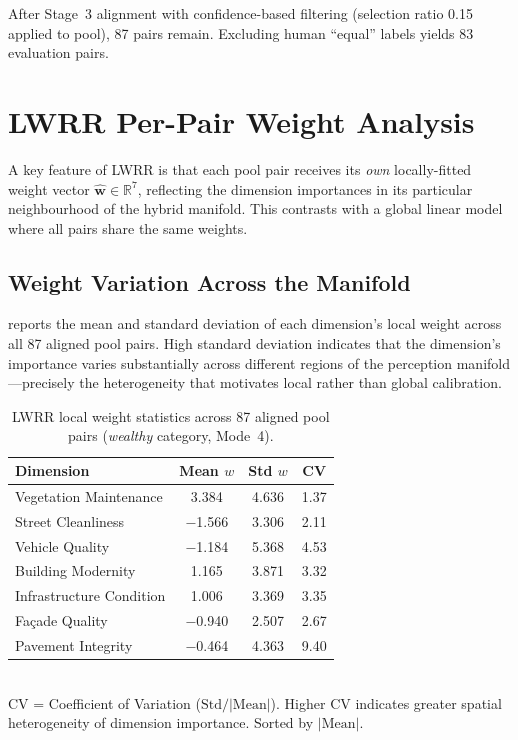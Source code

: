 \documentclass[runningheads]{llncs}
\begin{document}
After Stage~3 alignment with confidence-based filtering (selection ratio 0.15 applied to pool), 87 pairs remain.
Excluding human ``equal'' labels yields 83 evaluation pairs.


\section{LWRR Per-Pair Weight Analysis}
\label{sec:lwrr_weights}

A key feature of LWRR is that each pool pair receives its \emph{own} locally-fitted weight vector $\hat{\mathbf{w}} \in \mathbb{R}^{7}$, reflecting the dimension importances in its particular neighbourhood of the hybrid manifold.
This contrasts with a global linear model where all pairs share the same weights.

\subsection{Weight Variation Across the Manifold}

 reports the mean and standard deviation of each dimension's local weight across all 87 aligned pool pairs.
High standard deviation indicates that the dimension's importance varies substantially across different regions of the perception manifold---precisely the heterogeneity that motivates local rather than global calibration.

\begin{table}[ht]
\centering
\caption{LWRR local weight statistics across 87 aligned pool pairs (\emph{wealthy} category, Mode~4).}
\label{tab:weight_variation}
\small
\begin{tabular}{lccc}
\toprule
Dimension & Mean $w$ & Std $w$ & CV \\
\midrule
Vegetation Maintenance    & 3.384 & 4.636 & 1.37 \\
Street Cleanliness        & $-$1.566 & 3.306 & 2.11 \\
Vehicle Quality           & $-$1.184 & 5.368 & 4.53 \\
Building Modernity        & 1.165 & 3.871 & 3.32 \\
Infrastructure Condition  & 1.006 & 3.369 & 3.35 \\
Fa\c{c}ade Quality       & $-$0.940 & 2.507 & 2.67 \\
Pavement Integrity        & $-$0.464 & 4.363 & 9.40 \\
\bottomrule
\end{tabular}
\\[4pt]
\footnotesize{CV = Coefficient of Variation ($\mathrm{Std}/|\mathrm{Mean}|$). Higher CV indicates greater spatial heterogeneity of dimension importance. Sorted by $|\text{Mean}|$.}
\end{table}
\end{document}
